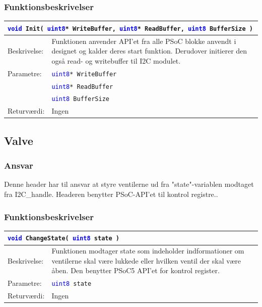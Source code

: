 \subsubsection{Funktionsbeskrivelser}
\begin{table}[H]
\begin{tabular}{l p{12.5cm}}
\multicolumn{2}{l}{\texttt{\textcolor{blue}{void} Init(  \texttt{\textcolor{blue}{uint8}* WriteBuffer}, 
\texttt{\textcolor{blue}{uint8}* ReadBuffer}, \texttt{\textcolor{blue}{uint8} BufferSize} )}} \\
\hline
Beskrivelse:& Funktionen anvender API'et fra alle PSoC blokke anvendt i designet og kalder deres start funktion. Derudover initierer den også read- og writebuffer til I2C modulet. \\
Parametre:&\texttt{\textcolor{blue}{uint8}* WriteBuffer}\\
&\texttt{\textcolor{blue}{uint8}* ReadBuffer}\\
&\texttt{\textcolor{blue}{uint8} BufferSize} \\
Returværdi:&Ingen\\
\end{tabular}
\end{table}

\subsection{Valve}
\subsubsection{Ansvar}
Denne header har til ansvar at styre ventilerne ud fra "state"-variablen modtaget fra I2C\_handle. Headeren benytter PSoC-API'et til kontrol registre..
\subsubsection{Funktionsbeskrivelser}
\begin{table}[H]
\begin{tabular}{l p{12.5cm}}
\multicolumn{2}{l}{\texttt{\textcolor{blue}{void} ChangeState( \textcolor{blue}{uint8} state )}} \\
\hline
Beskrivelse:& Funktionen modtager state som indeholder indformationer om ventilerne skal være lukkede eller hvilken ventil der skal være åben. Den benytter PSoC5 API'et for kontrol register.\\
Parametre:&\texttt{\textcolor{blue}{uint8} state}\\
Returværdi:&Ingen\\
\end{tabular}
\end{table}

